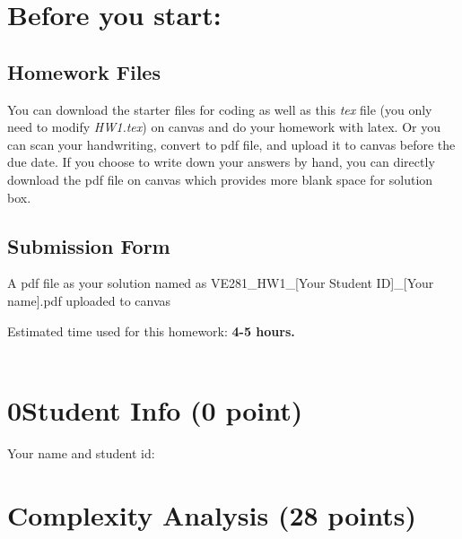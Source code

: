 \documentclass[11pt]{exam}
\begin{document}
\setlength{\parindent}{0pt}
\section*{Before you start:}

\subsection*{Homework Files}
You can download the starter files for coding as well as this \textit{tex} file (you only need to modify \textit{HW1.tex}) on canvas and do your homework with latex. Or you can scan your handwriting, convert to pdf file, and upload it to canvas before the due date. If you choose to write down your answers by hand, you can directly download the pdf file on canvas which provides more blank space for solution box.\\

\subsection*{Submission Form}
A pdf file as your solution named as VE281\_HW1\_[Your Student ID]\_[Your name].pdf uploaded to canvas

Estimated time used for this homework: \textbf{4-5 hours.}
\\\\

\newpage
\section*{0\quad Student Info (0 point)}
Your name and student id:
\begin{solution}

\end{solution}

\section{Complexity Analysis (28 points)}
\end{document}

